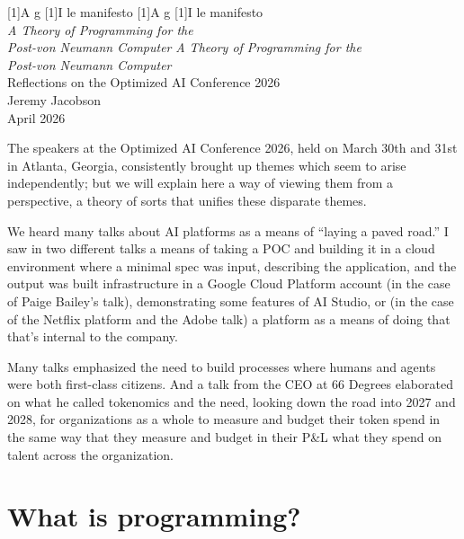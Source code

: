 \documentclass[12pt]{extarticle}
\begin{document}
\thispagestyle{firstpage}
\begin{center}
\vspace*{1ex}
\ifdefined\mobileformat
  {\fontsize{28}{34}\selectfont
    {\aifont\scalebox{1.4}[1]{A}}%
    g%
    {\aifont\scalebox{1.4}[1]{I}}%
    le manifesto}
\else
  {\fontsize{42}{50}\selectfont
    {\aifont\scalebox{1.4}[1]{A}}%
    g%
    {\aifont\scalebox{1.4}[1]{I}}%
    le manifesto}
\fi
\\[1.5ex]
\ifdefined\mobileformat
  {\large\itshape A Theory of Programming for the\\Post-von Neumann Computer}
\else
  {\Large\itshape A Theory of Programming for the\\Post-von Neumann Computer}
\fi
\\[0.8ex]
{\small Reflections on the Optimized AI Conference 2026}
\\[1.5ex]
Jeremy Jacobson\\[0.3ex]
{\small April 2026}
\end{center}
\bigskip

The speakers at the Optimized AI Conference 2026, held on March 30th and 31st in Atlanta, Georgia, consistently brought up themes which seem to arise independently; but we will explain here a way of viewing them from a perspective, a theory of sorts that unifies these disparate themes.

We heard many talks about AI platforms as a means of ``laying a paved road.'' I saw in two different talks a means of taking a POC and building it in a cloud environment where a minimal spec was input, describing the application, and the output was built infrastructure in a Google Cloud Platform account (in the case of Paige Bailey's talk), demonstrating some features of AI Studio, or (in the case of the Netflix platform and the Adobe talk) a platform as a means of doing that that's internal to the company.

Many talks emphasized the need to build processes where humans and agents were both first-class citizens. And a talk from the CEO at 66 Degrees elaborated on what he called tokenomics and the need, looking down the road into 2027 and 2028, for organizations as a whole to measure and budget their token spend in the same way that they measure and budget in their P\&L what they spend on talent across the organization.

\section{What is programming?}
\end{document}
